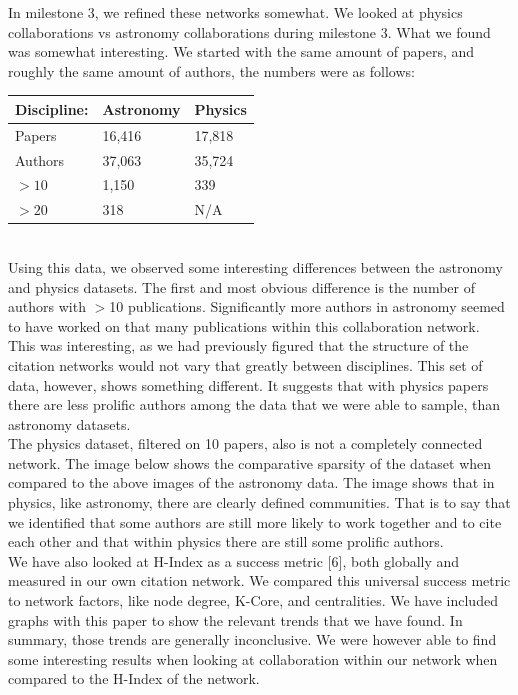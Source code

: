 \documentclass[times, 10pt,twocolumn]{article}
\begin{document}
In milestone 3, we refined these networks somewhat. We looked at physics collaborations vs astronomy collaborations during milestone 3. What we found was somewhat interesting. We started with the same amount of papers, and roughly the same amount of authors, the numbers were as follows: \\

    \begin{tabular}{ | l | l | l |}
    \hline
    Discipline: & Astronomy & Physics \\ \hline
    Papers & 16,416 & 17,818  \\ \hline
    Authors & 37,063 & 35,724 \\ \hline
    $> 10$ & 1,150 & 339 \\ \hline
    $> 20$ & 318 & N/A \\ \hline
    \end{tabular}\\

Using this data, we observed some interesting differences between the astronomy and physics datasets. The first and most obvious difference is the number of authors with $>$10 publications. Significantly more authors in astronomy seemed to have worked on that many publications within this collaboration network. \\

This was interesting, as we had previously figured that the structure of the citation networks would not vary that greatly between disciplines. This set of data, however, shows something different. It suggests that with physics papers there are less prolific authors among the data that we were able to sample, than astronomy datasets. \\

The physics dataset, filtered on 10 papers, also is not a completely connected network. The image below shows the comparative sparsity of the dataset when compared to the above images of the astronomy data. The image shows that in physics, like astronomy, there are clearly defined communities. That is to say that we identified that some authors are still more likely to work together and to cite each other and that within physics there are still some prolific authors. \\

We have also looked at H-Index as a success metric [6], both globally and measured in our own citation network. We compared this universal success metric to network factors, like node degree, K-Core, and centralities. We have included graphs with this paper to show the relevant trends that we have found. In summary, those trends are generally inconclusive. We were however able to find some interesting results when looking at collaboration within our network when compared to the H-Index of the network. \\
\end{document}
